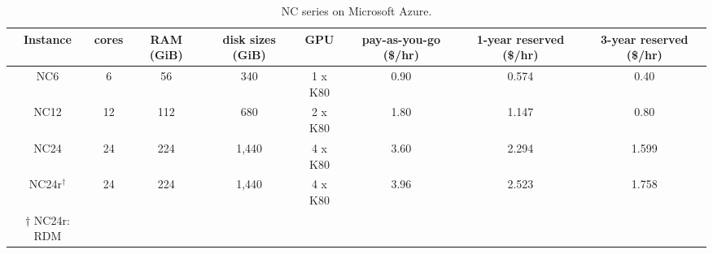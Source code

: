 \begin{table*}
\caption{\label{tab:table}NC series on Microsoft Azure.}
\begin{center}
\begin{tabular}{cccccccc}
Instance & cores & RAM (GiB) & disk sizes (GiB) & GPU & pay-as-you-go (\$/hr) & 1-year reserved (\$/hr) & 3-year reserved (\$/hr) \\
\hline
NC6 & 6 & 56 & 340 & 1 x K80 & 0.90 & 0.574 & 0.40 \\
NC12 & 12 & 112 & 680 & 2 x K80 & 1.80 & 1.147 & 0.80 \\
NC24 & 24 & 224 & 1,440 & 4 x K80 & 3.60 & 2.294 & 1.599 \\
NC24r$^\dagger$ & 24 & 224 & 1,440 & 4 x K80 & 3.96 & 2.523 & 1.758 \\
\hline
$\dagger$ NC24r: RDM
\end{tabular}
\end{center}
\end{table*}